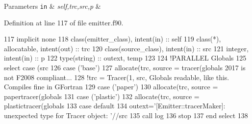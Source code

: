 \begin{DoxyParams}[1]{Parameters}
\mbox{\tt in}  & {\em self,trc,src,p} & \\
\hline
\end{DoxyParams}


Definition at line 117 of file emitter.\+f90.


\begin{DoxyCode}
117     \textcolor{keywordtype}{implicit none}
118     \textcolor{keywordtype}{class}(emitter\_class), \textcolor{keywordtype}{intent(in)} :: self
119     \textcolor{keywordtype}{class}(*), \textcolor{keywordtype}{allocatable}, \textcolor{keywordtype}{intent(out)} :: trc
120     \textcolor{keywordtype}{class}(source\_class), \textcolor{keywordtype}{intent(in)} :: src
121     \textcolor{keywordtype}{integer}, \textcolor{keywordtype}{intent(in)} :: p
122     \textcolor{keywordtype}{type}(string) :: outext, temp
123 
124     \textcolor{comment}{!PARALLEL Globals%
125     \textcolor{keywordflow}{select case} (src%
126     \textcolor{keywordflow}{case} (\textcolor{stringliteral}{'base'})
127         \textcolor{keyword}{allocate}(trc, source = tracer(globals%
       2017 is not F2008 compliant...}
128         \textcolor{comment}{!trc = Tracer(1, src, Globals%
       readable, like this. Compiles fine in GFortran}
129     \textcolor{keywordflow}{case} (\textcolor{stringliteral}{'paper'})
130         \textcolor{keyword}{allocate}(trc, source = papertracer(globals%
131     \textcolor{keywordflow}{case} (\textcolor{stringliteral}{'plastic'})
132         \textcolor{keyword}{allocate}(trc, source = plastictracer(globals%
133 \textcolor{keywordflow}{        case default}
134         outext=\textcolor{stringliteral}{'[Emitter::tracerMaker]: unexpected type for Tracer object: '}//src%
135         \textcolor{keyword}{call }log%
136         stop
137 \textcolor{keywordflow}{    end select}
138 
\end{DoxyCode}
